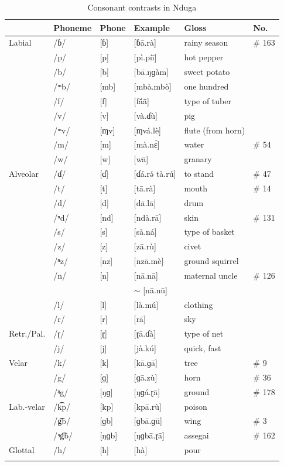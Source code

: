 \documentclass[output=paper,colorlinks,citecolor=brown
]{langscibook}
\begin{document}
\begin{table}
\caption{Consonant contrasts in Nduga}
\label{tab:olson:conscontrast}
 \begin{tabular}{llllll}
  \lsptoprule
            & Phoneme & Phone & Example & Gloss & No. \\
  \midrule
Labial & /ɓ/ & [ɓ] & [ɓā.rà] & rainy season & \# 163\\
       & /p/ & [p] & [pì.píī] & hot pepper & \\
       & /b/ & [b] & [bā.ŋɡàm] & sweet potato & \\
       & /ᵐb/ & [mb] & [mbà.mbò] & one hundred & \\
       & /f/ & [f] & [fã́ã̄] & type of tuber & \\
       & /v/ & [v] & [và.ɗù] & pig & \\
       & /ᵐv/ & [ɱv] & [ɱvá.lè] & flute (from horn) & \\
       & /m/ & [m] & [mà.nɛ̀] & water & \# 54 \\
       & /w/ & [w] & [wā] & granary & \\
Alveolar & /ɗ/ & [ɗ] & [ɗá.rə́ tà.rú] & to stand & \# 47 \\
       & /t/ & [t] & [tā.rà] & mouth & \# 14 \\
       & /d/ & [d] & [dā.lā] & drum & \\
       & /ⁿd/ & [nd] & [ndà.rā] & skin & \# 131 \\
       & /s/ & [s] & [sà.ná] & type of basket & \\
       & /z/ & [z] & [zā.rù] & civet & \\
       & /ⁿz/ & [nz] & [nzā.mè] & ground squirrel & \\
       & /n/ & [n] & [nā.nā]  & maternal uncle &  \# 126 \\
       &     &     & \(\sim \) [nā.nū] &  & \\
       & /l/ & [l] & [là.mú] & clothing & \\
       & /r/ & [r] & [rā] & sky & \\
Retr./Pal. & /ɽ/ & [ɽ] & [ɽā.ɗà] & type of net & \\
       & /j/ & [j] & [jà.kú] & quick, fast & \\
Velar  & /k/ & [k] & [kā.ɡā] & tree & \# 9 \\
       & /g/ & [ɡ] & [ɡā.zù] & horn & \# 36 \\
       & /ᵑg/ & [ŋɡ] & [ŋɡá.ɽā] & ground & \# 178 \\
Lab.-velar & /k͡p/ & [kp] & [kpā.rù] & poison & \\
       & /g͡b/ & [ɡb] & [ɡbā.ɡū] & wing & \# 3 \\
       & /ᵑg͡b/ & [ŋɡb] & [ŋɡbā.ɽā] & assegai & \# 162 \\
Glottal & /h/ & [h] & [hà] & pour & \\
  \lspbottomrule
 \end{tabular}
\end{table}
\end{document}
